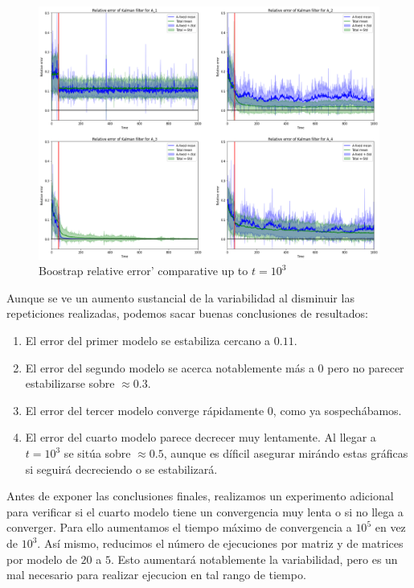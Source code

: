 \documentclass[a4paper]{article}
\begin{document}
\begin{figure}[H]
	\includegraphics[scale=.6]{figures/kalman3}
	\centering
	\caption{Boostrap relative error' comparative up to $t=10^3$}
\end{figure}

Aunque se ve un aumento sustancial de la variabilidad al disminuir las repeticiones realizadas, podemos sacar buenas conclusiones de resultados:

\begin{enumerate}
	\item El error del primer modelo se estabiliza cercano a $0.11$.
	\item El error del segundo modelo se acerca notablemente más a $0$ pero no parecer estabilizarse sobre $\approx 0.3$. 
	\item El error del tercer modelo converge rápidamente $0$, como ya sospechábamos. 
	\item El error del cuarto modelo parece decrecer muy lentamente. Al llegar a $t=10^3$ se sitúa sobre  $\approx 0.5$, aunque es díficil asegurar mirándo estas gráficas si seguirá decreciendo o se estabilizará. 
\end{enumerate}

Antes de exponer las conclusiones finales, realizamos un experimento adicional para verificar si el cuarto modelo tiene un convergencia muy lenta o si no llega a converger. Para ello aumentamos el tiempo máximo de convergencia a $10^5$ en vez de $10^3$. Así mismo, reducimos el número de ejecuciones por matriz y de matrices por modelo de $20$ a $5$. Esto aumentará notablemente la variabilidad, pero es un mal necesario para realizar ejecucion en tal rango de tiempo.
\end{document}
